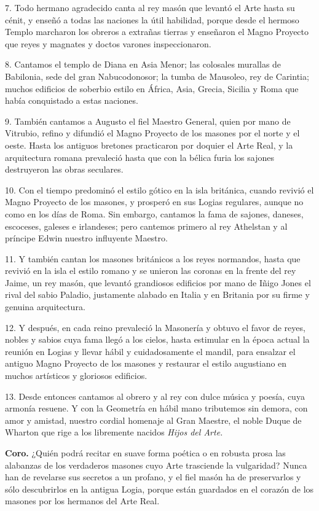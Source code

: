 \documentclass[a4paper,12pt,twoside]{book}
\begin{document}
7. Todo hermano agradecido canta al rey masón que levantó el Arte hasta su cénit, y enseñó a todas las naciones la útil habilidad, porque desde el hermoso Templo marcharon los obreros a extrañas tierras y enseñaron el Magno Proyecto que reyes y magnates y doctos varones inspeccionaron.

8. Cantamos el templo de Diana en Asia Menor; las colosales murallas de Babilonia, sede del gran Nabucodonosor; la tumba de Mausoleo, rey de Carintia; muchos edificios de soberbio estilo en África, Asia, Grecia, Sicilia y Roma que había conquistado a estas naciones.

9. También cantamos a Augusto el fiel Maestro General, quien por mano de Vitrubio, refino y difundió el Magno Proyecto de los masones por el norte y el oeste. Hasta los antiguos bretones practicaron por doquier el Arte Real, y la arquitectura romana prevaleció hasta que con la bélica furia los sajones destruyeron las obras seculares.

10. Con el tiempo predominó el estilo gótico en la isla británica, cuando revivió el Magno Proyecto de los masones, y prosperó en sus Logias regulares, aunque no como en los días de Roma. Sin embargo, cantamos la fama de sajones, daneses, escoceses, galeses e irlandeses; pero cantemos primero al rey Athelstan y al príncipe Edwin nuestro influyente Maestro.

11. Y también cantan los masones británicos a los reyes normandos, hasta que revivió en la isla el estilo romano y se unieron las coronas en la frente del rey Jaime, un rey masón, que levantó grandiosos edificios por mano de Iñigo Jones el rival del sabio Paladio, justamente alabado en Italia y en Britania por su firme y genuina arquitectura.

12. Y después, en cada reino prevaleció la Masonería y obtuvo el favor de reyes, nobles y sabios cuya fama llegó a los cielos, hasta estimular en la época actual la reunión en Logias y llevar hábil y cuidadosamente el mandil, para ensalzar el antiguo Magno Proyecto de los masones y restaurar el estilo augustiano en muchos artísticos y gloriosos edificios.

13. Desde entonces cantamos al obrero y al rey con dulce música y poesía, cuya armonía resuene. Y con la Geometría en hábil mano tributemos sin demora, con amor y amistad, nuestro cordial homenaje al Gran Maestre, el noble Duque de Wharton que rige a los libremente nacidos \textit{Hijos del Arte.}

\noindent \textbf{Coro.} ¿Quién podrá recitar en suave forma poética o en robusta prosa las alabanzas de los verdaderos masones cuyo Arte trasciende la vulgaridad? Nunca han de revelarse sus secretos a un profano, y el fiel masón ha de preservarlos y sólo descubrirlos en la antigua Logia, porque están guardados en el corazón de los masones por los hermanos del Arte Real.
\end{document}
